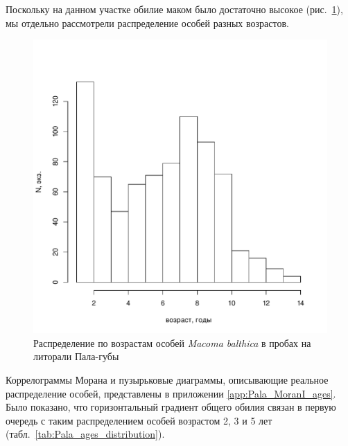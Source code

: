 Поскольку на данном участке обилие маком было достаточно высокое (рис.~\ref{ris:age_Pala_2007_low}), мы отдельно рассмотрели распределение особей разных возрастов.
%
	\begin{figure}[h]
		\includegraphics{../Barenc_Sea/Pala/Pala_2007_low_age_hist.pdf}
		\caption{Распределение по возрастам особей {\it Macoma balthica} в пробах на литорали Пала-губы}
		\label{ris:age_Pala_2007_low}
	\end{figure}
%
Коррелограммы Морана и пузырьковые диаграммы, описывающие реальное распределение особей, представлены в приложении \ref{app:Pala_MoranI_ages}.
Было показано, что горизонтальный градиент общего обилия связан в первую очередь с таким распределением особей возрастом 2, 3 и 5 лет (табл.~\ref{tab:Pala_ages_distribution}). 
%
